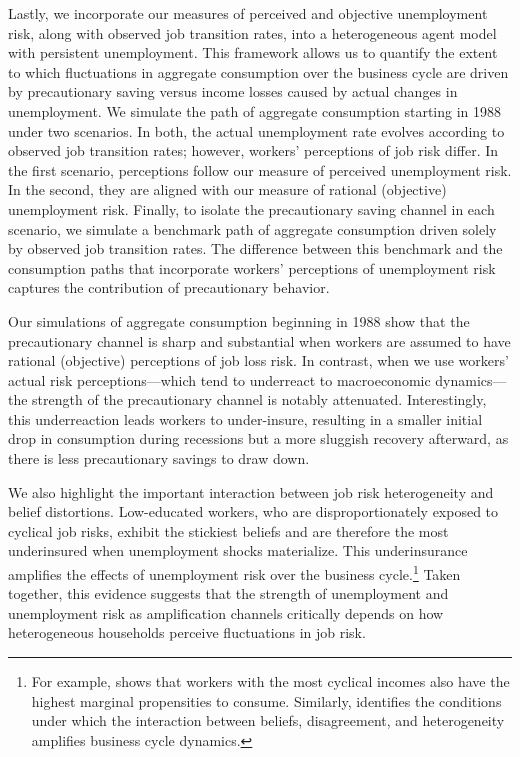 Lastly, we incorporate our measures of perceived and objective unemployment risk, along with observed job transition rates, into a heterogeneous agent model with persistent unemployment. This framework allows us to quantify the extent to which fluctuations in aggregate consumption over the business cycle are driven by precautionary saving versus income losses caused by actual changes in unemployment. We simulate the path of aggregate consumption starting in 1988 under two scenarios. In both, the actual unemployment rate evolves according to observed job transition rates; however, workers' perceptions of job risk differ. In the first scenario, perceptions follow our measure of perceived unemployment risk. In the second, they are aligned with our measure of rational (objective) unemployment risk. Finally, to isolate the precautionary saving channel in each scenario, we simulate a benchmark path of aggregate consumption driven solely by observed job transition rates. The difference between this benchmark and the consumption paths that incorporate workers' perceptions of unemployment risk captures the contribution of precautionary behavior.

Our simulations of aggregate consumption beginning in 1988 show that the precautionary channel is sharp and substantial when workers are assumed to have rational (objective) perceptions of job loss risk. In contrast, when we use workers’ actual risk perceptions—which tend to underreact to macroeconomic dynamics—the strength of the precautionary channel is notably attenuated. Interestingly, this underreaction leads workers to under-insure, resulting in a smaller initial drop in consumption during recessions but a more sluggish recovery afterward, as there is less precautionary savings to draw down. 




We also highlight the important interaction between job risk heterogeneity and belief distortions. Low-educated workers, who are disproportionately exposed to cyclical job risks, exhibit the stickiest beliefs and are therefore the most underinsured when unemployment shocks materialize. This underinsurance amplifies the effects of unemployment risk over the business cycle.\footnote{For example, \cite{patterson2023matching} shows that workers with the most cyclical incomes also have the highest marginal propensities to consume. Similarly, \cite{guerreiro2023belief} identifies the conditions under which the interaction between beliefs, disagreement, and heterogeneity amplifies business cycle dynamics.} Taken together, this evidence suggests that the strength of unemployment and unemployment risk as amplification channels critically depends on how heterogeneous households perceive fluctuations in job risk.










